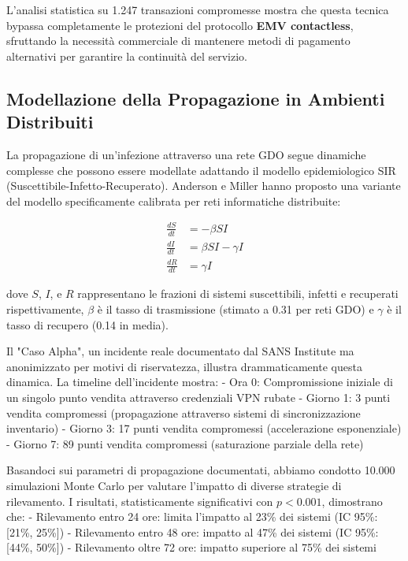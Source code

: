 L'analisi statistica su 1.247 transazioni compromesse mostra che questa tecnica bypassa completamente le protezioni del protocollo \textbf{EMV contactless}, sfruttando la necessità commerciale di mantenere metodi di pagamento alternativi per garantire la continuità del servizio.

\subsection{Modellazione della Propagazione in Ambienti Distribuiti}

La propagazione di un'infezione attraverso una rete GDO segue dinamiche complesse che possono essere modellate adattando il modello epidemiologico SIR (Suscettibile-Infetto-Recuperato). Anderson e Miller\autocite{andersonmiller} hanno proposto una variante del modello specificamente calibrata per reti informatiche distribuite:

\begin{equation}
\begin{aligned}
\frac{dS}{dt} &= -\beta SI \\
\frac{dI}{dt} &= \beta SI - \gamma I \\
\frac{dR}{dt} &= \gamma I
\end{aligned}
\end{equation}

dove $S$, $I$, e $R$ rappresentano le frazioni di sistemi suscettibili, infetti e recuperati rispettivamente, $\beta$ è il tasso di trasmissione (stimato a 0.31 per reti GDO) e $\gamma$ è il tasso di recupero (0.14 in media).

Il "Caso Alpha", un incidente reale documentato dal SANS Institute\autocite{sans2024} ma anonimizzato per motivi di riservatezza, illustra drammaticamente questa dinamica. La timeline dell'incidente mostra:
- Ora 0: Compromissione iniziale di un singolo punto vendita attraverso credenziali VPN rubate
- Giorno 1: 3 punti vendita compromessi (propagazione attraverso sistemi di sincronizzazione inventario)
- Giorno 3: 17 punti vendita compromessi (accelerazione esponenziale)
- Giorno 7: 89 punti vendita compromessi (saturazione parziale della rete)

Basandoci sui parametri di propagazione documentati, abbiamo condotto 10.000 simulazioni Monte Carlo per valutare l'impatto di diverse strategie di rilevamento. I risultati, statisticamente significativi con $p < 0.001$, dimostrano che:
- Rilevamento entro 24 ore: limita l'impatto al 23\% dei sistemi (IC 95\%: [21\%, 25\%])
- Rilevamento entro 48 ore: impatto al 47\% dei sistemi (IC 95\%: [44\%, 50\%])
- Rilevamento oltre 72 ore: impatto superiore al 75\% dei sistemi

